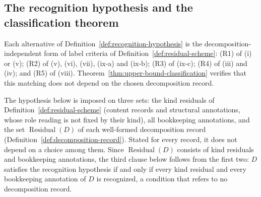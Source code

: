 \documentclass[11pt]{article}
\theoremstyle{definition}
\newcommand{\Residual}[1]{\ensuremath{\operatorname{Residual}\!\left(#1\right)}}
\begin{document}
\subsection{The recognition hypothesis and the classification theorem}\label{subsec:classification-theorem}

Each alternative of Definition~\ref{def:recognition-hypothesis} is the
decomposition-independent form of label criteria of
Definition~\ref{def:residual-scheme}: (R1) of (i) or (v); (R2) of (v), (vi),
(vii), (ix-a) and (ix-b); (R3) of (ix-c); (R4) of (iii) and (iv); and (R5) of
(viii). Theorem~\ref{thm:upper-bound-classification} verifies that this
matching does not depend on the chosen decomposition record.

The hypothesis below is imposed on three sets: the kind residuals of Definition~\ref{def:residual-scheme} (content records and structural annotations, whose role reading is not fixed by their kind), all bookkeeping annotations, and the set \(\Residual{D}\) of each well-formed decomposition record (Definition~\ref{def:decomposition-record}). Stated for every record, it
does not depend on a choice among them. Since \(\Residual{D}\) consists of kind
residuals and bookkeeping annotations, the third clause below follows from the first two: \(D\) satisfies the recognition
hypothesis if and only if every kind residual and every bookkeeping annotation of
\(D\) is recognized, a condition that refers to no decomposition
record.
\end{document}
